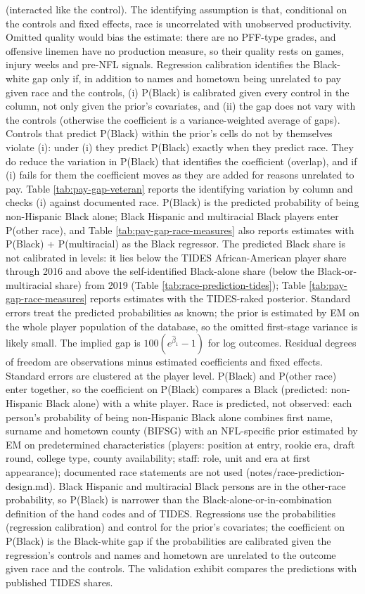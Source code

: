 {(interacted like the control). The identifying assumption is that, conditional on the controls and fixed effects, race is uncorrelated with unobserved productivity. Omitted quality would bias the estimate: there are no PFF-type grades, and offensive linemen have no production measure, so their quality rests on games, injury weeks and pre-NFL signals. Regression calibration identifies the Black-white gap only if, in addition to names and hometown being unrelated to pay given race and the controls, (i) P(Black) is calibrated given every control in the column, not only given the prior's covariates, and (ii) the gap does not vary with the controls (otherwise the coefficient is a variance-weighted average of gaps). Controls that predict P(Black) within the prior's cells do not by themselves violate (i): under (i) they predict P(Black) exactly when they predict race. They do reduce the variation in P(Black) that identifies the coefficient (overlap), and if (i) fails for them the coefficient moves as they are added for reasons unrelated to pay. Table \ref{tab:pay-gap-veteran} reports the identifying variation by column and checks (i) against documented race. P(Black) is the predicted probability of being non-Hispanic Black alone; Black Hispanic and multiracial Black players enter P(other race), and Table \ref{tab:pay-gap-race-measures} also reports estimates with P(Black) + P(multiracial) as the Black regressor. The predicted Black share is not calibrated in levels: it lies below the TIDES African-American player share through 2016 and above the self-identified Black-alone share (below the Black-or-multiracial share) from 2019 (Table \ref{tab:race-prediction-tides}); Table \ref{tab:pay-gap-race-measures} reports estimates with the TIDES-raked posterior. Standard errors treat the predicted probabilities as known; the prior is estimated by EM on the whole player population of the database, so the omitted first-stage variance is likely small. The implied gap is $100(e^{\hat\beta_1}-1)$ for log outcomes. Residual degrees of freedom are observations minus estimated coefficients and fixed effects. Standard errors are clustered at the player level. P(Black) and P(other race) enter together, so the coefficient on P(Black) compares a Black (predicted: non-Hispanic Black alone) with a white player. Race is predicted, not observed: each person's probability of being non-Hispanic Black alone combines first name, surname and hometown county (BIFSG) with an NFL-specific prior estimated by EM on predetermined characteristics (players: position at entry, rookie era, draft round, college type, county availability; staff: role, unit and era at first appearance); documented race statements are not used (notes/race-prediction-design.md). Black Hispanic and multiracial Black persons are in the other-race probability, so P(Black) is narrower than the Black-alone-or-in-combination definition of the hand codes and of TIDES. Regressions use the probabilities (regression calibration) and control for the prior's covariates; the coefficient on P(Black) is the Black-white gap if the probabilities are calibrated given the regression's controls and names and hometown are unrelated to the outcome given race and the controls. The validation exhibit compares the predictions with published TIDES shares.
\par}

